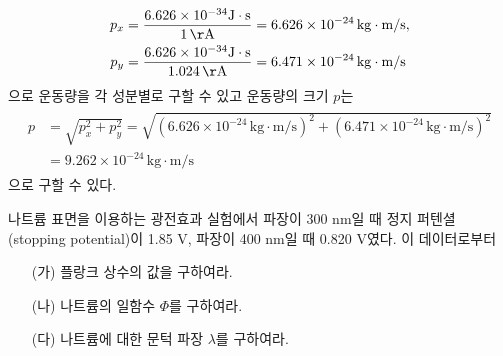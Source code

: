 \documentclass[tightenlines,floatfix,nofootinbib,superscriptaddress,fleqn]{revtex4}
\begin{document}
\begin{itemize}
\begin{align}
  \begin{split}
    p_x &= \frac{6.626\times 10^{-34}\mathrm{J\cdot s}}{1\,\mathrm{\AA}}
    =  6.626\times 10^{-24}\,\mathrm{kg\cdot m/s}, \\
    p_y &= \frac{6.626\times 10^{-34}\mathrm{J\cdot s}}{1.024\,\mathrm{\AA}}
    =6.471\times 10^{-24}\,\mathrm{kg\cdot m/s}
  \end{split}
 \end{align}
 으로 운동량을 각 성분별로 구할 수 있고 운동량의 크기 $p$는
 \begin{align}
  \begin{split}
    p &=\sqrt{p_x^2+p_y^2} = \sqrt{(6.626\times 10^{-24}\,\mathrm{kg\cdot m/s})^2
    +(6.471\times 10^{-24}\,\mathrm{kg\cdot m/s})^2}  \\
    &= 9.262\times 10^{-24}\,\mathrm{kg\cdot m/s}
  \end{split}
 \end{align}
 으로 구할 수 있다.
\end{itemize}

\vspace{1cm}

나트륨 표면을 이용하는 광전효과 실험에서 파장이 300 nm일 때 정지
퍼텐셜(stopping potential)이 1.85 V, 파장이 400 nm일 때 0.820
V였다. 이 데이터로부터 
\begin{itemize}
\item[(가)] 플랑크 상수의 값을 구하여라.
\item[(나)] 나트륨의 일함수 $\Phi$를 구하여라. 
\item[(다)] 나트륨에 대한 문턱 파장 $\lambda$를 구하여라. 
\end{itemize}
\end{document}
